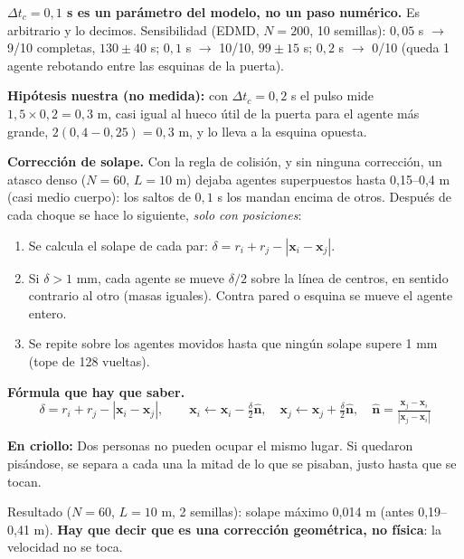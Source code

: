 \documentclass[10.5pt,a4paper]{article}
\newcommand{\vect}[1]{\mathbf{#1}}
\newcommand{\analogia}[1]{\par\colorbox{ana}{\parbox{\dimexpr\linewidth-2\fboxsep}{\textbf{En criollo:} #1}}\par}
\newcommand{\formula}[1]{\par\colorbox{fml}{\parbox{\dimexpr\linewidth-2\fboxsep}{\textbf{Fórmula que hay que saber.} #1}}\par}
\newcommand{\hipotesis}[1]{\par\colorbox{hipo}{\parbox{\dimexpr\linewidth-2\fboxsep}{\textbf{Hipótesis nuestra (no medida):} #1}}\par}
\begin{document}
\textbf{$\Delta t_c=0{,}1$ s es un parámetro del modelo, no un paso numérico.} Es arbitrario y lo decimos. Sensibilidad (EDMD, $N=200$, 10 semillas): $0{,}05$ s $\to$ 9/10 completas, $130\pm40$ s; $0{,}1$ s $\to$ 10/10, $99\pm15$ s; $0{,}2$ s $\to$ 0/10 (queda 1 agente rebotando entre las esquinas de la puerta).
\hipotesis{con $\Delta t_c=0{,}2$ s el pulso mide $1{,}5\times0{,}2=0{,}3$ m, casi igual al hueco útil de la puerta para el agente más grande, $2(0{,}4-0{,}25)=0{,}3$ m, y lo lleva a la esquina opuesta.}

\textbf{Corrección de solape.} Con la regla de colisión, y sin ninguna corrección, un atasco denso ($N=60$, $L=10$ m) dejaba agentes superpuestos hasta 0,15--0,4 m (casi medio cuerpo): los saltos de $0{,}1$ s los mandan encima de otros. Después de cada choque se hace lo siguiente, \emph{solo con posiciones}:
\begin{enumerate}
\item Se calcula el solape de cada par: $\delta=r_i+r_j-|\vect x_i-\vect x_j|$.
\item Si $\delta>1$ mm, cada agente se mueve $\delta/2$ sobre la línea de centros, en sentido contrario al otro (masas iguales). Contra pared o esquina se mueve el agente entero.
\item Se repite sobre los agentes movidos hasta que ningún solape supere 1 mm (tope de 128 vueltas).
\end{enumerate}
\formula{\[\delta=r_i+r_j-|\vect x_i-\vect x_j|,\qquad \vect x_i\leftarrow\vect x_i-\tfrac{\delta}{2}\hat{\vect n},\quad \vect x_j\leftarrow\vect x_j+\tfrac{\delta}{2}\hat{\vect n},\quad \hat{\vect n}=\tfrac{\vect x_j-\vect x_i}{|\vect x_j-\vect x_i|}\]}
\analogia{Dos personas no pueden ocupar el mismo lugar. Si quedaron pisándose, se separa a cada una la mitad de lo que se pisaban, justo hasta que se tocan.}
Resultado ($N=60$, $L=10$ m, 2 semillas): solape máximo 0,014 m (antes 0,19--0,41 m). \textbf{Hay que decir que es una corrección geométrica, no física}: la velocidad no se toca.
\end{document}

